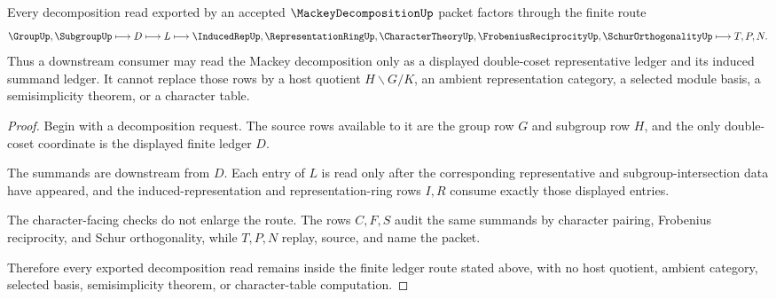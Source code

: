 \begin{theorem}
\label{thm:mackey-decomposition-double-coset-ledger}
Every decomposition read exported by an accepted $\MackeyDecompositionUp$ packet factors through the finite route
$$
\GroupUp,\SubgroupUp \longmapsto D \longmapsto L \longmapsto \InducedRepUp,\RepresentationRingUp,\CharacterTheoryUp,\FrobeniusReciprocityUp,\SchurOrthogonalityUp \longmapsto T,P,N .
$$
Thus a downstream consumer may read the Mackey decomposition only as a displayed double-coset representative ledger and its induced summand ledger. It cannot replace those rows by a host quotient $H\backslash G/K$, an ambient representation category, a selected module basis, a semisimplicity theorem, or a character table.
\end{theorem}
\begin{proof}
Begin with a decomposition request. The source rows available to it are the group row $G$ and subgroup row $H$, and the only double-coset coordinate is the displayed finite ledger $D$.

The summands are downstream from $D$. Each entry of $L$ is read only after the corresponding representative and subgroup-intersection data have appeared, and the induced-representation and representation-ring rows $I,R$ consume exactly those displayed entries.

The character-facing checks do not enlarge the route. The rows $C,F,S$ audit the same summands by character pairing, Frobenius reciprocity, and Schur orthogonality, while $T,P,N$ replay, source, and name the packet.

Therefore every exported decomposition read remains inside the finite ledger route stated above, with no host quotient, ambient category, selected basis, semisimplicity theorem, or character-table computation.
\end{proof}


